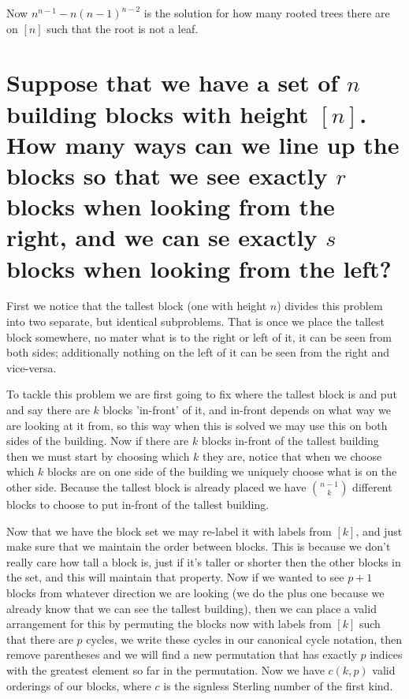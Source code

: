 \documentclass{article}
\theoremstyle{definition}
\begin{document}
	Now $n^{n-1} - n(n-1)^{n-2}$ is the solution for how many rooted trees there are on $[n]$ such that the root is not a leaf.
	
	\section{Suppose that we have a set of $n$ building blocks with height $[n]$. How many ways can we line up the blocks so that we see exactly $r$ blocks when looking from the right, and we can se exactly $s$ blocks when looking from the left?}
	
	First we notice that the tallest block (one with height $n$) divides this problem into two separate, but identical subproblems. That is once we place the tallest block somewhere, no mater what is to the right or left of it, it can be seen from both sides; additionally nothing on the left of it can be seen from the right and vice-versa.
	
	To tackle this problem we are first going to fix where the tallest block is and put and say there are $k$ blocks 'in-front' of it, and in-front depends on what way we are looking at it from, so this way when this is solved we may use this on both sides of the building. Now if there are $k$ blocks in-front of the tallest building then we must start by choosing which $k$ they are, notice that when we choose which $k$ blocks are on one side of the building we uniquely choose what is on the other side. Because the tallest block is already placed we have $\binom{n-1}k$ different blocks to choose to put in-front of the tallest building.
	
	Now that we have the block set we may re-label it with labels from $[k]$, and just make sure that we maintain the order between blocks. This is because we don't really care how tall a block is, just if it's taller or shorter then the other blocks in the set, and this will maintain that property. Now if we wanted to see $p+1$ blocks from whatever direction we are looking (we do the plus one because we already know that we can see the tallest building), then we can place a valid arrangement for this by permuting the blocks now with labels from $[k]$ such that there are $p$ cycles, we write these cycles in our canonical cycle notation, then remove parentheses and we will find a new permutation that has exactly $p$ indices with the greatest element so far in the permutation. Now we have $c(k,p)$ valid orderings of our blocks, where $c$ is the signless Sterling number of the first kind.
	
\end{document}
